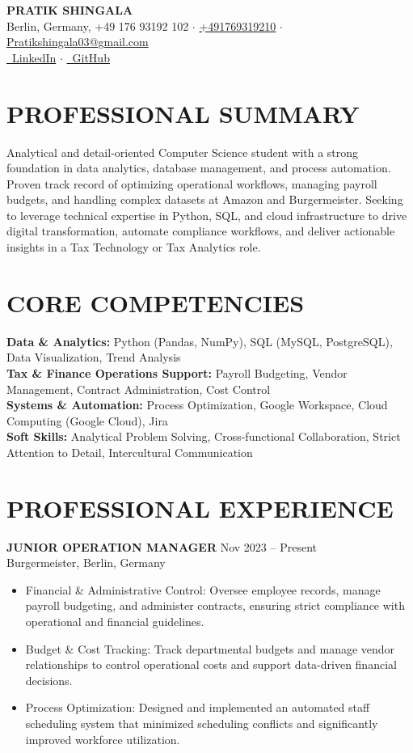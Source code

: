 \documentclass[11pt,a4paper]{article}
\newcommand{\cvheader}[5]{
    \centering
    {\LARGE\bfseries #1} \\
    \vspace{3pt}
    {\small #2, #3 $\cdot$ \href{tel:#4}{#4} $\cdot$ \href{mailto:#5}{#5}} \\
    \vspace{2pt}
    {\small \href{https://linkedin.com/in/pratikshingala03}{\faLinkedin\ LinkedIn} $\cdot$ \href{https://github.com/pratikshingala03}{\faGithub\ GitHub}}
    \vspace{10pt}
}
\newcommand{\cventry}[4]{
    \noindent\textbf{#1} \hfill {\small\color{lightgray}#2} \\
    {\small\color{lightgray}#3} \\
    #4
    \vspace{6pt}
}
\newcommand{\cvitem}[1]{
    \item #1
}
\begin{document}
\cvheader{PRATIK SHINGALA}{Berlin, Germany}{+49 176 93192 102}{+491769319210}{Pratikshingala03@gmail.com}

\section{PROFESSIONAL SUMMARY}
Analytical and detail-oriented Computer Science student with a strong foundation in data analytics, database management, and process automation. Proven track record of optimizing operational workflows, managing payroll budgets, and handling complex datasets at Amazon and Burgermeister. Seeking to leverage technical expertise in Python, SQL, and cloud infrastructure to drive digital transformation, automate compliance workflows, and deliver actionable insights in a Tax Technology or Tax Analytics role.

\section{CORE COMPETENCIES}

\noindent
\textbf{Data \& Analytics:} Python (Pandas, NumPy), SQL (MySQL, PostgreSQL), Data Visualization, Trend Analysis \\
\textbf{Tax \& Finance Operations Support:} Payroll Budgeting, Vendor Management, Contract Administration, Cost Control \\
\textbf{Systems \& Automation:} Process Optimization, Google Workspace, Cloud Computing (Google Cloud), Jira \\
\textbf{Soft Skills:} Analytical Problem Solving, Cross-functional Collaboration, Strict Attention to Detail, Intercultural Communication

\section{PROFESSIONAL EXPERIENCE}

\cventry{JUNIOR OPERATION MANAGER}{Nov 2023 – Present}{Burgermeister, Berlin, Germany}
{
\begin{itemize}[leftmargin=15pt, itemsep=3pt]
    \cvitem{Financial \& Administrative Control: Oversee employee records, manage payroll budgeting, and administer contracts, ensuring strict compliance with operational and financial guidelines.}
    \cvitem{Budget \& Cost Tracking: Track departmental budgets and manage vendor relationships to control operational costs and support data-driven financial decisions.}
    \cvitem{Process Optimization: Designed and implemented an automated staff scheduling system that minimized scheduling conflicts and significantly improved workforce utilization.}
\end{itemize}
}
\end{document}
